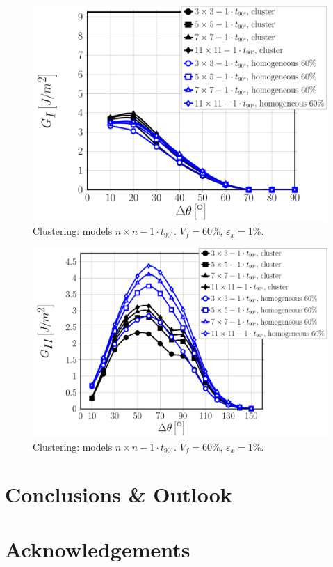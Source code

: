 \documentclass[review]{elsarticle}
\begin{document}
\begin{figure}[!h]
\centering
\includegraphics[width=\textwidth]{nxn-1t90-vf60-GI.pdf}
\caption{Clustering: models $n\times n-1\cdot t_{90^{\circ}}$. $V_{f}=60\%$, $\varepsilon_{x}=1\%$.}\label{fig:debonddebondGI}
\end{figure}

\begin{figure}[!h]
\centering
\includegraphics[width=\textwidth]{nxn-1t90-vf60-GII.pdf}
\caption{Clustering: models $n\times n-1\cdot t_{90^{\circ}}$. $V_{f}=60\%$, $\varepsilon_{x}=1\%$.}\label{fig:debonddebondGI}
\end{figure}

\section{Conclusions \& Outlook}




\section*{Acknowledgements}




\end{document}
